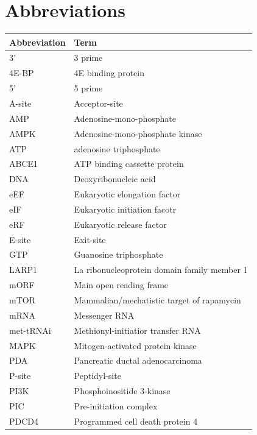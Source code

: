 \documentclass[
  12pt,
  openany]{book}
\author{}
\date{\vspace{-2.5em}}
\begin{document}
{
\setcounter{tocdepth}{4}
\tableofcontents
}
\cleardoublepage
{}
\pagestyle{fancy}
\fancyhf{}
\renewcommand{\headrulewidth}{0pt}
\fancyfoot[LE,RO]{\thepage}
\renewcommand{\floatpagefraction}{.9}

\setcounter{page}{11}

\hypertarget{abbreviations}{%
\chapter*{Abbreviations}\label{abbreviations}}

\begin{tabular}{ll}
\toprule
Abbreviation & Term\\
\midrule
3' & 3 prime\\
4E-BP & 4E binding protein\\
5' & 5 prime\\
A-site & Acceptor-site\\
AMP & Adenosine-mono-phosphate\\
AMPK & Adenosine-mono-phosphate
kinase\\
ATP & adenosine triphosphate\\
ABCE1 & ATP binding cassette protein\\
DNA & Deoxyribonucleic acid\\
eEF & Eukaryotic elongation factor\\
eIF & Eukaryotic initiation facotr\\
eRF & Eukaryotic release factor\\
E-site & Exit-site\\
GTP & Guanosine triphosphate\\
LARP1 & La ribonucleoprotein domain family member 1\\
mORF & Main open reading frame\\
mTOR & Mammalian/mechatistic target of rapamycin\\
mRNA & Messenger RNA\\
met-tRNAi & Methionyl-initiatior transfer RNA\\
MAPK & Mitogen-activated protein
kinase\\
PDA & Pancreatic ductal adenocarcinoma\\
P-site & Peptidyl-site\\
PI3K & Phosphoinositide 3-kinase\\
PIC & Pre-initiation complex\\
PDCD4 & Programmed cell death protein 4\\

\end{tabular}
\end{document}

